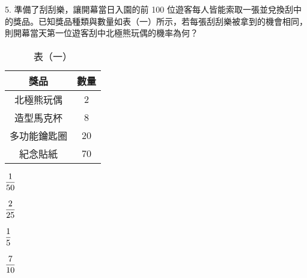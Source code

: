 \documentclass[12pt]{article}
\begin{document}
\begin{problem}
  \small
  \item[5.] 準備了刮刮樂，讓開幕當日入園的前 100 位遊客每人皆能索取一張並兌換刮中的獎品。已知獎品種類與數量如表（一）所示，若每張刮刮樂被拿到的機會相同，則開幕當天第一位遊客刮中北極熊玩偶的機率為何？
  \begin{table}[ht]
    \centering\small
    \renewcommand{\arraystretch}{1.2}
    \vspace*{-1ex}
    \caption*{表（一）}
    \vspace*{-2ex}
    \begin{tabular}{|c|c|}
      \hline
      \textbf{獎品} & \textbf{數量} \\ \hline
      北極熊玩偶 & 2 \\ \hline
      造型馬克杯 & 8 \\ \hline
      多功能鑰匙圈 & 20 \\ \hline
      紀念貼紙 & 70 \\ \hline
    \end{tabular}
    \vspace*{-2ex}
  \end{table}
  \begin{choices}
    \item $\fraction{1}{50}$
    \item $\fraction{2}{25}$
    \item $\fraction{1}{5}$
    \item $\fraction{7}{10}$
  \end{choices}
\end{problem}
\end{document}
